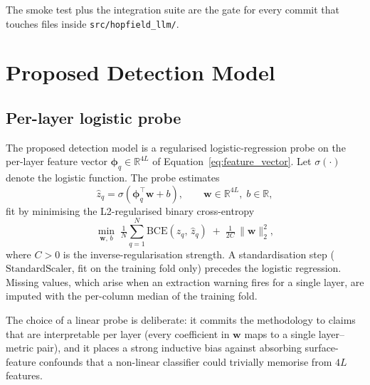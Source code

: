 The smoke test plus the integration suite are the gate for every commit
that touches files inside \texttt{src/hopfield\_llm/}.

\section{Proposed Detection Model}
\label{sec:proposed_model}

\subsection{Per-layer logistic probe}
\label{subsec:probe}

The proposed detection model is a regularised logistic-regression probe
on the per-layer feature vector $\boldsymbol{\phi}_q \in \mathbb{R}^{4L}$
of Equation~\eqref{eq:feature_vector}. Let $\sigma(\cdot)$ denote the
logistic function. The probe estimates
\begin{equation}
    \hat{z}_q
    =
    \sigma\!\left(\boldsymbol{\phi}_q^{\!\top} \boldsymbol{w} + b\right),
    \qquad
    \boldsymbol{w} \in \mathbb{R}^{4L},\;
    b \in \mathbb{R},
    \label{eq:logistic_probe}
\end{equation}
fit by minimising the L2-regularised binary cross-entropy
\begin{equation}
    \min_{\boldsymbol{w},\,b}\; \tfrac{1}{N}\!\sum_{q=1}^N
    \mathrm{BCE}\!\left(z_q,\,\hat{z}_q\right)
    \;+\;
    \tfrac{1}{2C}\,\|\boldsymbol{w}\|_2^2,
    \label{eq:logistic_objective}
\end{equation}
where $C > 0$ is the inverse-regularisation strength. A standardisation
step ($\mathrm{StandardScaler}$, fit on the training fold only) precedes
the logistic regression. Missing values, which arise when an extraction
warning fires for a single layer, are imputed with the per-column median
of the training fold.

The choice of a linear probe is deliberate: it commits the methodology
to claims that are interpretable per layer (every coefficient in
$\boldsymbol{w}$ maps to a single layer–metric pair), and it places a
strong inductive bias against absorbing surface-feature confounds that a
non-linear classifier could trivially memorise from $4L$ features.

